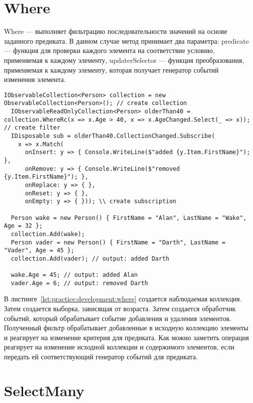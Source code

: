 \section{Where}
\label{sub:development:where}

Where --- выполняет фильтрацию последовательности значений на основе заданного предиката.
В данном случае метод принимает два параметра: predicate --- функция для проверки каждого элемента на соответствие условию,
применяемая к каждому элементу, updaterSelector --- функция преобразования,
применяемая к каждому элементу, которая получает генератор событий изменения элемента.

\begin{lstlisting}[style=csharpinlinestyle, caption={Пример использования Where}, label=lst:practice:development:where]
  IObservableCollection<Person> collection = new ObservableCollection<Person>(); // create collection
  IObservableReadOnlyCollection<Person> olderThan40 = collection.WhereRc(x => x.Age > 40, x => x.AgeChanged.Select(_ => x)); // create filter
  IDisposable sub = olderThan40.CollectionChanged.Subscribe(
    x => x.Match(
      onInsert: y => { Console.WriteLine($"added {y.Item.FirstName}"); },
      onRemove: y => { Console.WriteLine($"removed {y.Item.FirstName}"); },
      onReplace: y => { },
      onReset: y => { },
      onEmpty: y => { })); \\ create subscription

  Person wake = new Person() { FirstName = "Alan", LastName = "Wake", Age = 32 };
  collection.Add(wake);
  Person vader = new Person() { FirstName = "Darth", LastName = "Vader", Age = 45 };
  collection.Add(vader); // output: added Darth

  wake.Age = 45; // output: added Alan
  vader.Age = 6; // output: removed Darth
\end{lstlisting}

В листинге~\ref{lst:practice:development:where} создается наблюдаемая коллекция. Затем создается выборка, зависящая от возраста. Затем создается обработчик событий,
который обрабатывает событие добавления и удаления элементов. Полученный фильтр обрабатывает добавленные в исходную коллекцию элементы и реагирует на изменение критерия для предиката.
Как можно заметить операция реагирует на изменение исходной коллекции и содержимого элементов, если передать ей соответствующий генератор событий для предиката.

\section{SelectMany}
\label{sub:development:select_many}

